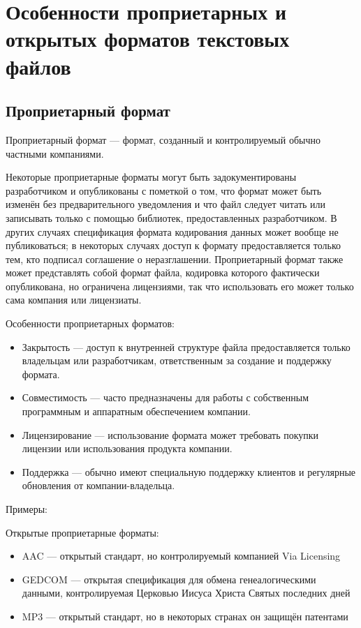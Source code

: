 \documentclass{ou}
\begin{document}
\section{Особенности проприетарных и открытых форматов текстовых файлов}
\subsection{Проприетарный формат}
Проприетарный формат — формат, созданный и контролируемый обычно частными компаниями.

Некоторые проприетарные форматы могут быть задокументированы разработчиком и опубликованы с пометкой о том, что формат может быть изменён без предварительного уведомления и что файл следует читать или записывать только с помощью библиотек, предоставленных разработчиком. В других случаях спецификация формата кодирования данных может вообще не публиковаться; в некоторых случаях доступ к формату предоставляется только тем, кто подписал соглашение о неразглашении. Проприетарный формат также может представлять собой формат файла, кодировка которого фактически опубликована, но ограничена лицензиями, так что использовать его может только сама компания или лицензиаты.

Особенности проприетарных форматов:
\begin{itemize}
    \item Закрытость — доступ к внутренней структуре файла предоставляется только владельцам или разработчикам, ответственным за создание и поддержку формата.
    \item Совместимость — часто предназначены для работы с собственным программным и аппаратным обеспечением компании.
    \item Лицензирование — использование формата может требовать покупки лицензии или использования продукта компании.
    \item Поддержка — обычно имеют специальную поддержку клиентов и регулярные обновления от компании-владельца.
\end{itemize}

Примеры:

Открытые проприетарные форматы:
\begin{itemize}
    \item {AAC — открытый стандарт, но контролируемый компанией Via Licensing}
    \item GEDCOM — открытая спецификация для обмена генеалогическими данными, контролируемая Церковью Иисуса Христа Святых последних дней
    \item MP3 — открытый стандарт, но в некоторых странах он защищён патентами
\end{itemize}
\end{document}
